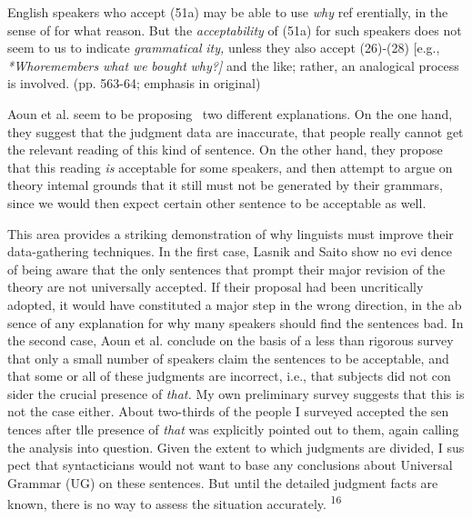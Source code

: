 \clearpage\setcounter{page}{1}\begin{styleStandard}
English speakers who accept (51a) may be able to use \textit{why}\textit{ }ref\- erentially, in the sense of {\textquotesingle}for what reason{\textquotesingle}. But the \textit{acceptability}\textit{ }of (51a) for such speakers does not seem to us to indicate \textit{grammatical\-}\textit{ }\textit{ity,}\textit{ }unless they also accept (26)-(28) [e.g., \textit{*Wh}\textit{o}\textit{remembers}\textit{ }\textit{what}\textit{ }\textit{we}\textit{ }\textit{bought}\textit{ }\textit{why?}\textit{]}\textit{ }and the like; rather, an analogical process is involved. (pp. 563-64; emphasis in original)
\end{styleStandard}


\begin{styleStandard}
Aoun et al. seem to be proposing \ two different explanations. On the one hand, they suggest that the judgment data are inaccurate, that people really cannot get the relevant reading of this kind of sentence. On the other hand, they propose that this reading \textit{is}\textit{ }acceptable for some speakers, and then attempt to argue on theory\- intemal grounds that it still must not be generated by their grammars, since we would then expect certain other sentence to be acceptable as well.
\end{styleStandard}


\begin{styleStandard}
This area provides a striking demonstration of why linguists must improve their data-gathering techniques. In the first case, Lasnik and Saito show no evi\- dence of being aware that the only sentences that prompt their major revision of the theory are not universally accepted. If their proposal had been uncritically adopted, it would have constituted a major step in the wrong direction, in the ab\- sence of any explanation for why many speakers should find the sentences bad. In the second case, Aoun et al. conclude on the basis of a less than rigorous survey that only a small number of speakers claim the sentences to be acceptable, and that some or all of these judgments are incorrect, i.e., that subjects did not con\- sider the crucial presence of \textit{that.}\textit{ }My own preliminary survey suggests that this is not the case either. About two-thirds of the people I surveyed accepted the sen\- tences after tlle presence of \textit{that}\textit{ }was explicitly pointed out to them, again calling the analysis into question. Given the extent to which judgments are divided, I sus\- pect that syntacticians would not want to base any conclusions about Universal Grammar (UG) on these sentences. But until the detailed judgment facts are known, there is no way to assess the situation accurately. \textsuperscript{16}
\end{styleStandard}


